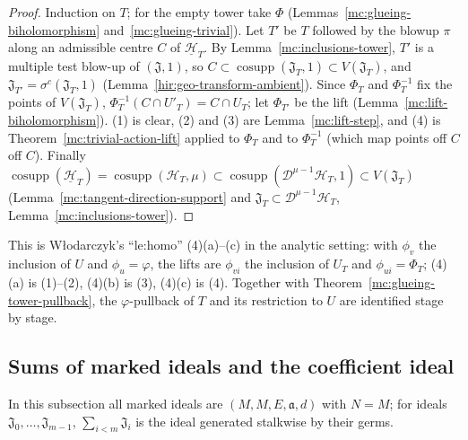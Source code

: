 \begin{proof}
\leanok
Induction on \(T\); for the empty tower take \(\Phi\) (Lemmas~\ref{mc:glueing-biholomorphism} and~\ref{mc:glueing-trivial}). Let \(T'\) be \(T\) followed by
the blowup \(\pi\) along an admissible centre \(C\) of \(\underline{\mathcal H}_T\). By Lemma~\ref{mc:inclusions-tower}, \(T'\) is a multiple test
blow-up of \((\mathfrak J,1)\), so \(C\subset\operatorname{cosupp}(\mathfrak J_T,1)\subset V(\mathfrak J_T)\), and \(\mathfrak J_{T'}=\sigma^c(\mathfrak J_T,1)\)
(Lemma~\ref{hir:geo-transform-ambient}). Since \(\Phi_T\) and \(\Phi_T^{-1}\) fix the points of \(V(\mathfrak J_T)\), \(\Phi_T^{-1}(C\cap U'_T)=C\cap U_T\);
let \(\Phi_{T'}\) be the lift (Lemma~\ref{mc:lift-biholomorphism}). (1) is clear, (2) and (3) are Lemma~\ref{mc:lift-step}, and (4) is
Theorem~\ref{mc:trivial-action-lift} applied to \(\Phi_T\) and to \(\Phi_T^{-1}\) (which map points off \(C\) off \(C\)). Finally
\(\operatorname{cosupp}(\underline{\mathcal H}_T)=\operatorname{cosupp}(\mathcal H_T,\mu)\subset\operatorname{cosupp}(\mathcal D^{\mu-1}\mathcal H_T,1)\subset V(\mathfrak J_T)\)
(Lemma~\ref{mc:tangent-direction-support} and \(\mathfrak J_T\subset\mathcal D^{\mu-1}\mathcal H_T\), Lemma~\ref{mc:inclusions-tower}).
\end{proof}
This is Włodarczyk's ``le:homo'' (4)(a)--(c) in the analytic setting: with \(\phi_v\) the inclusion of \(U\) and \(\phi_u=\varphi\), the lifts are
\(\phi_{vi}\) the inclusion of \(U_T\) and \(\phi_{ui}=\Phi_T\); (4)(a) is (1)--(2), (4)(b) is (3), (4)(c) is (4). Together with
Theorem~\ref{mc:glueing-tower-pullback}, the \(\varphi\)-pullback of \(T\) and its restriction to \(U\) are identified stage by stage.

\subsection{Sums of marked ideals and the coefficient ideal}

In this subsection all marked ideals are \((M,M,E,\mathfrak a,d)\) with \(N=M\); for ideals \(\mathfrak J_0,\dots,\mathfrak J_{m-1}\),
\(\sum_{i<m}\mathfrak J_i\) is the ideal generated stalkwise by their germs.

